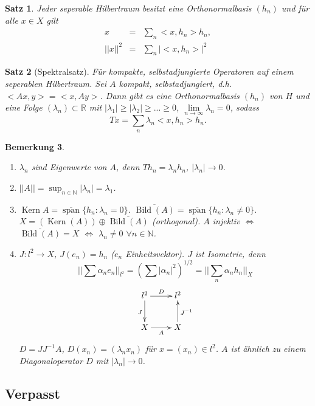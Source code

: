 \documentclass[12pt,a4paper,titlepage]{scrartcl}
\newtheorem{Satz}{Satz}[subsection]
\newtheorem{Bemerkung}[Satz]{Bemerkung}
\DeclareMathOperator{\Kern}{Kern}
\DeclareMathOperator{\Bild}{Bild}
\DeclareMathOperator{\spann}{span}
\numberwithin{equation}{section}
\newcommand{\R}{\mathbb{R}} %
\newcommand{\N}{\mathbb{N}} %
\begin{document}
	\begin{Satz}
		Jeder seperable Hilbertraum besitzt eine Orthonormalbasis $(h_n)$ und für alle $x\in X$ gilt
		\begin{eqnarray}
			x &=& \sum_n <x,h_n>h_n,\nonumber\\
			||x||^2 &=& \sum_n|<x,h_n>|^2 \nonumber
		\end{eqnarray}	
	\end{Satz}
	
	\begin{Satz}[Spektralsatz]
		Für kompakte, selbstadjungierte Operatoren auf einem seperablen Hilbertraum.
		Sei $A$ kompakt, selbstadjungiert, d.h. $<Ax, y> = <x, Ay>$. Dann gibt es eine Orthonormalbasis $(h_n)$ von $H$ und eine Folge $(\lambda_n)\subset\R$ mit $|\lambda_1|\geq |\lambda_2|\geq...\geq 0$, $\lim\limits_{n\rightarrow\infty} \lambda_n = 0$, sodass
		$$ Tx= \sum_n \lambda_n<x,h_n>h_n.$$
	\end{Satz}
	
	\begin{Bemerkung}~
		\begin{enumerate}
			\item[a)] $\lambda_n$ sind Eigenwerte von $A$, denn $Th_n = \lambda_nh_n$, $|\lambda_n|\rightarrow 0$.
			\item[b)] $||A|| = \sup_{n\in \N}|\lambda_n| = \lambda_1$.
			\item[c)] $\Kern A = \overline{\spann}\{h_n:\lambda_n = 0 \}$. $\overline{\Bild(A)} = \overline{\spann}\{h_n: \lambda_n\neq 0\}$. $X = (\Kern(A))\oplus\overline{\Bild(A)}$ (orthogonal). $A$ injektiv $\Leftrightarrow$ $\overline{\Bild(A)} = X$ $\Leftrightarrow$ $\lambda_n \neq 0$ $\forall n\in \N$.
			\item[d)] $J:l^2\rightarrow X$, $J(e_n) = h_n$ ($e_n$ Einheitsvektor). $J$ ist Isometrie, denn
			$$||\sum \alpha_n e_n||_{l^2} = (\sum |\alpha_n|^2)^{1/2} = ||\sum_n \alpha_n h_n||_X$$
			$$\xymatrix{
				l^2\ar[r]^D \ar[d]_J & l^2\\
				X\ar[r]_A & X\ar[u]_{J^{-1}}
				}$$
			$D = JJ^{-1}A$, $D(x_n) = (\lambda_n x_n)$ für $x= (x_n) \in l^2$. $A$ ist ähnlich zu einem Diagonaloperator $D$ mit $|\lambda_n|\rightarrow 0$.
		\end{enumerate}
	\end{Bemerkung}
	
	\subsection{Verpasst}
	
\end{document}

